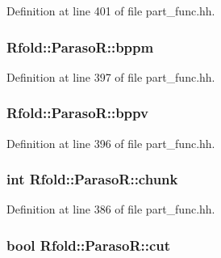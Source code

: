 Definition at line 401 of file part\+\_\+func.\+hh.

\hypertarget{class_rfold_1_1_paraso_r_a0372b87e995aa99226a2e5c0bda44800}{
\subsubsection[{bppm}]{ Rfold\+::\+Paraso\+R\+::bppm}}\label{class_rfold_1_1_paraso_r_a0372b87e995aa99226a2e5c0bda44800}


Definition at line 397 of file part\+\_\+func.\+hh.

\hypertarget{class_rfold_1_1_paraso_r_a34ad7bc233e6711a93c7cb69c8ed9855}{
\subsubsection[{bppv}]{ Rfold\+::\+Paraso\+R\+::bppv}}\label{class_rfold_1_1_paraso_r_a34ad7bc233e6711a93c7cb69c8ed9855}


Definition at line 396 of file part\+\_\+func.\+hh.

\hypertarget{class_rfold_1_1_paraso_r_aafdf04b7ad506cfa1457bfefa3423e31}{
\subsubsection[{chunk}]{\setlength{\rightskip}{0pt plus 5cm}int Rfold\+::\+Paraso\+R\+::chunk}}\label{class_rfold_1_1_paraso_r_aafdf04b7ad506cfa1457bfefa3423e31}


Definition at line 386 of file part\+\_\+func.\+hh.

\hypertarget{class_rfold_1_1_paraso_r_afd1dd1d5fccc77e48fa36bb090be6735}{
\subsubsection[{cut}]{\setlength{\rightskip}{0pt plus 5cm}bool Rfold\+::\+Paraso\+R\+::cut}}\label{class_rfold_1_1_paraso_r_afd1dd1d5fccc77e48fa36bb090be6735}


